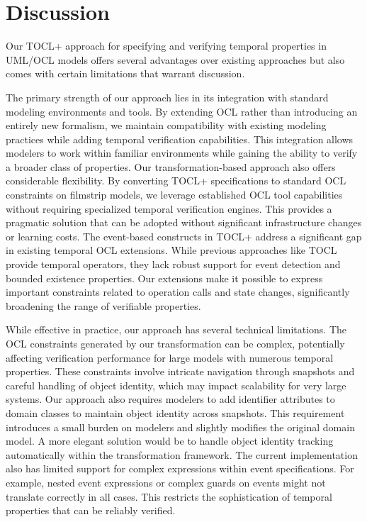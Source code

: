 \section{Discussion}

\hspace{1cm} Our TOCL+ approach for specifying and verifying temporal properties in 
UML/OCL models offers several advantages over existing approaches but also comes with 
certain limitations that warrant discussion.

The primary strength of our approach lies in its integration with standard modeling 
environments and tools. By extending OCL rather than introducing an entirely new 
formalism, we maintain compatibility with existing modeling practices while adding 
temporal verification capabilities. This integration allows modelers to work within 
familiar environments while gaining the ability to verify a broader class of 
properties. Our transformation-based approach also offers considerable flexibility. 
By converting TOCL+ specifications to standard OCL constraints on filmstrip models, 
we leverage established OCL tool capabilities without requiring specialized temporal 
verification engines. This provides a pragmatic solution that can be adopted without 
significant infrastructure changes or learning costs. The event-based constructs in 
TOCL+ address a significant gap in existing temporal OCL extensions. While previous 
approaches like TOCL provide temporal operators, they lack robust support for event 
detection and bounded existence properties. Our extensions make it possible to express 
important constraints related to operation calls and state changes, significantly 
broadening the range of verifiable properties.

While effective in practice, our approach has several technical limitations. The OCL 
constraints generated by our transformation can be complex, potentially affecting 
verification performance for large models with numerous temporal properties. These 
constraints involve intricate navigation through snapshots and careful handling of 
object identity, which may impact scalability for very large systems. Our approach 
also requires modelers to add identifier attributes to domain classes to maintain 
object identity across snapshots. This requirement introduces a small burden on 
modelers and slightly modifies the original domain model. A more elegant solution 
would be to handle object identity tracking automatically within the transformation 
framework. The current implementation also has limited support for complex expressions 
within event specifications. For example, nested event expressions or complex guards 
on events might not translate correctly in all cases. This restricts the sophistication 
of temporal properties that can be reliably verified.

